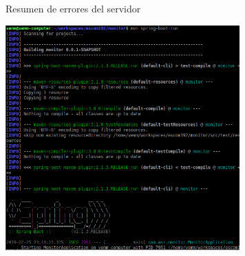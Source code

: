 \begin{enumerate}
\begin{figure}[htbp]
				\caption[Resumen de errores del servidor]{Resumen de errores del servidor}
				\label{fig:20}
			\end{figure}
			\begin{figure}[htbp]
			\centering
				\includegraphics[width=9cm]{./img/lista/20_1.png}
				\label{fig:20.1}
			\end{figure}
	\end{enumerate}